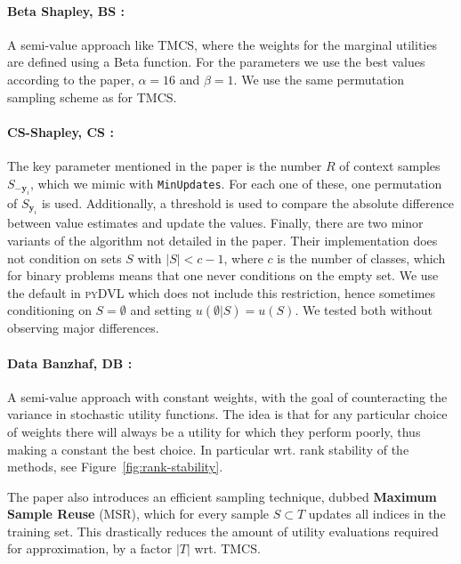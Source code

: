 \documentclass[10pt]{article}
\newcommand{\tmdfn}[1]{\textbf{#1}}
\newcommand{\tmmathbf}[1]{\ensuremath{\boldsymbol{#1}}}
\newcommand{\tmname}[1]{\textsc{#1}}
\newcommand{\python}[1]{\texttt{#1}}
\begin{document}
\paragraph{Beta Shapley, BS {\citep{kwon_beta_2022}}:}A semi-value approach
like TMCS, where the weights for the marginal utilities are defined using a
Beta function. For the parameters we use the best values according to the
paper, $\alpha = 16$ and $\beta = 1$. We use the same permutation sampling
scheme as for TMCS.

\paragraph{CS-Shapley, CS {\citep{schoch_csshapley_2022}}:}The key parameter
mentioned in the paper is the number $R$ of context samples
$S_{-\tmmathbf{y}_i}$, which we mimic with {\small{{\python{MinUpdates}}}}.
For each one of these, one permutation of $S_{\tmmathbf{y}_i}$ is used.
Additionally, a threshold is used to compare the absolute difference between
value estimates and update the values. Finally, there are two minor variants
of the algorithm not detailed in the paper. Their implementation does not
condition on sets $S$ with $| S | < c - 1$, where $c$ is the number of
classes, which for binary problems means that one never conditions on the
empty set. We use the default in {\tmname{pyDVL}} which does not include this
restriction, hence sometimes conditioning on $S = \emptyset$ and setting $u
(\emptyset |S) = u (S)$. We tested both without observing major differences.

\paragraph{Data Banzhaf, DB {\citep{wang_data_2022}}:}A semi-value approach
with constant weights, with the goal of counteracting the variance in
stochastic utility functions. The idea is that for any particular choice of
weights there will always be a utility for which they perform poorly, thus
making a constant the best choice. In particular wrt. rank stability of the
methods, see  Figure~\ref{fig:rank-stability}.

The paper also introduces an efficient sampling technique, dubbed
{\tmdfn{Maximum Sample Reuse}} (MSR), which for every sample $S \subset T$
updates all indices in the training set. This drastically reduces the amount
of utility evaluations required for approximation, by a factor $| T |$ wrt.
TMCS.
\end{document}
